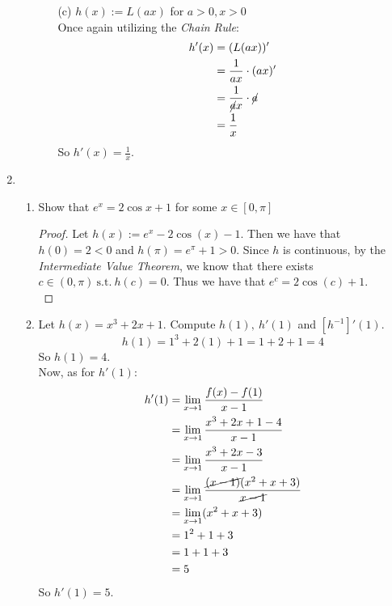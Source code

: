 \documentclass[12pt,letterpaper]{article}
\newcommand{\st}{\ \text{s.t.}\ }
\theoremstyle{case}
\theoremstyle{definition}
\begin{document}
\begin{enumerate}
\begin{enumerate}
\begin{enumerate}
				\item[(c)] $h(x):=L(ax)$ for $a >0,x>0$\\
				
				Once again utilizing the \textit{Chain Rule}:
				\begin{align*}
					h'(x) &= (L(ax))' \\
					&= \frac{1}{ax} \cdot (ax)' \\
					&= \frac{1}{\cancel{a}x} \cdot \cancel{a} \\
					&= \frac{1}{x}
				\end{align*}
				So $h'(x)=\frac{1}{x}$.\\
			\end{enumerate}
		\end{enumerate}
		\item
		\begin{enumerate}
			\item Show that $e^x=2\cos x+1$ for some $x \in [0, \pi]$\\
			
			\begin{proof}
				Let $h(x):=e^x-2\cos(x)-1$. Then we have that $h(0)=2<0$ and $h(\pi)=e^\pi+1>0$. Since $h$ is continuous, by the \textit{Intermediate Value Theorem}, we know that there exists $c \in (0,\pi) \st h(c)=0$. Thus we have that $e^c=2\cos(c)+1$.\\
			\end{proof}
			\item Let $h(x)=x^3+2x+1$. Compute $h(1),\ h'(1)$ and $[h^{-1}]'(1)$.\\
			
			\[h(1) = 1^3+2(1)+1 = 1+2+1 = 4\]
			So $h(1)=4$.\\
			
			Now, as for $h'(1)$:
			\begin{align*}
				h'(1) &= \lim\limits_{x \to 1} \frac{f(x)-f(1)}{x-1} \\
				&= \lim\limits_{x \to 1} \frac{x^3+2x+1-4}{x-1} \\
				&= \lim\limits_{x \to 1} \frac{x^3+2x-3}{x-1} \\
				&= \lim\limits_{x \to 1} \frac{\cancel{(x-1)}(x^2+x+3)}{\cancel{x-1}} \\
				&= \lim\limits_{x \to 1} (x^2+x+3) \\
				&= 1^2+1+3 \\
				&= 1 +1 +3 \\
				&= 5
			\end{align*}
			So $h'(1)=5$.\\
			

\end{enumerate}
\end{enumerate}
\end{document}
